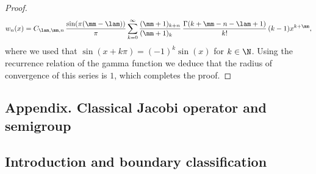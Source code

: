 \begin{proof}
\begin{align*}
w_n(x) = C_{\lam, \mm, n}\, \frac{\sin(\pi(\mm-\lam))}{\pi} \sum_{k = 0}^{\infty} \frac{(\mm+1)_{k+n}}{(\mm+1)_{k\phantom{+n}}}\, \frac{\Gamma(k+\mm-n-\lam+1)}{k!}\,(k-1) x^{k+\mm},
\end{align*}
where we used that $\sin(x+k\pi) = (-1)^k\sin(x)$ for $k \in \N$. Using the recurrence relation of the gamma function we deduce that the radius of convergence of this series is $1$, which completes the proof.
\end{proof}

\begin{appendix}
\section*{Appendix. Classical Jacobi operator and semigroup}
\label{sec:classical-Jacobi}

\subsection{Introduction and boundary classification}


\end{appendix}
